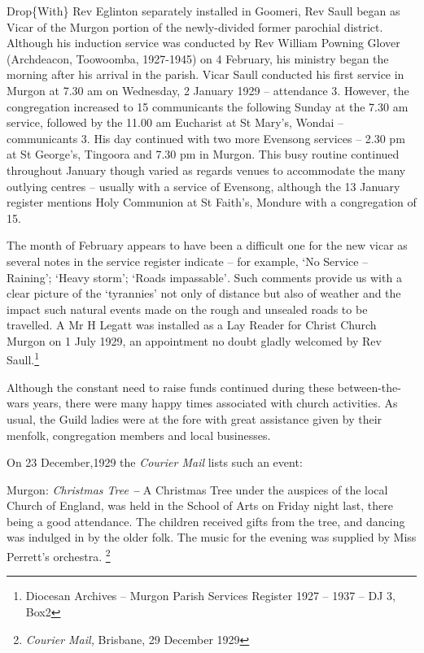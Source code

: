Drop\{With\} Rev Eglinton separately installed in Goomeri, Rev Saull began as Vicar of the Murgon portion of the newly-divided former parochial district. Although his induction service was conducted by Rev William Powning Glover (Archdeacon, Toowoomba, 1927-1945) on 4 February, his ministry began the morning after his arrival in the parish. Vicar Saull conducted his first service in Murgon at 7.30 am on Wednesday, 2 January 1929 -- attendance 3. However, the congregation increased to 15 communicants the following Sunday at the 7.30 am service, followed by the 11.00 am Eucharist at St Mary's, Wondai -- communicants 3. His day continued with two more Evensong services -- 2.30 pm at St George's, Tingoora and 7.30 pm in Murgon. This busy routine continued throughout January though varied as regards venues to accommodate the many outlying centres -- usually with a service of Evensong, although the 13 January register mentions Holy Communion at St Faith's, Mondure with a congregation of 15.

The month of February appears to have been a difficult one for the new vicar as several notes in the service register indicate -- for example, `No Service -- Raining'; `Heavy storm'; `Roads impassable'\emph{.} Such comments provide us with a clear picture of the `tyrannies' not only of distance but also of weather and the impact such natural events made on the rough and unsealed roads to be travelled. A Mr H Legatt was installed as a Lay Reader for Christ Church Murgon on 1 July 1929, an appointment no doubt gladly welcomed by Rev Saull.\footnote{Diocesan Archives -- Murgon Parish Services Register 1927 -- 1937 -- DJ 3, Box2}

Although the constant need to raise funds continued during these between-the-wars years, there were many happy times associated with church activities. As usual, the Guild ladies were at the fore with great assistance given by their menfolk, congregation members and local businesses.

On 23 December,1929 the \emph{Courier Mail} lists such an event:

Murgon: \emph{Christmas Tree \textbf{-- }}A Christmas Tree under the auspices of the local Church of England, was held in the School of Arts on Friday night last, there being a good attendance. The children received gifts from the tree, and dancing was indulged in by the older folk. The music for the evening was supplied by Miss Perrett's orchestra. \footnote{\emph{Courier Mail,} Brisbane, 29 December 1929}

